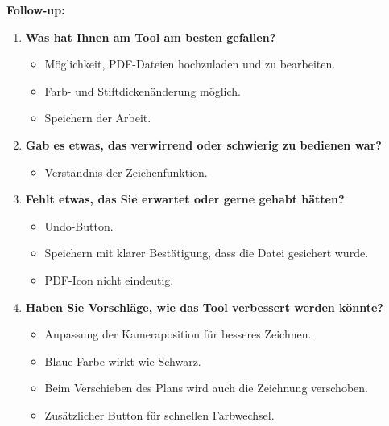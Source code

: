 \textbf{Follow-up:}
\begin{enumerate}
    \item \textbf{Was hat Ihnen am Tool am besten gefallen?}
    \begin{itemize}
        \item Möglichkeit, PDF-Dateien hochzuladen und zu bearbeiten.
        \item Farb- und Stiftdickenänderung möglich.
        \item Speichern der Arbeit.
    \end{itemize}

    \item \textbf{Gab es etwas, das verwirrend oder schwierig zu bedienen war?}
    \begin{itemize}
        \item Verständnis der Zeichenfunktion.
    \end{itemize}

    \item \textbf{Fehlt etwas, das Sie erwartet oder gerne gehabt hätten?}
    \begin{itemize}
        \item Undo-Button.
        \item Speichern mit klarer Bestätigung, dass die Datei gesichert wurde.
        \item PDF-Icon nicht eindeutig.
    \end{itemize}

    \item \textbf{Haben Sie Vorschläge, wie das Tool verbessert werden könnte?}
    \begin{itemize}
        \item Anpassung der Kameraposition für besseres Zeichnen.
        \item Blaue Farbe wirkt wie Schwarz.
        \item Beim Verschieben des Plans wird auch die Zeichnung verschoben.
        \item Zusätzlicher Button für schnellen Farbwechsel.
    \end{itemize}
\end{enumerate}
\clearpage